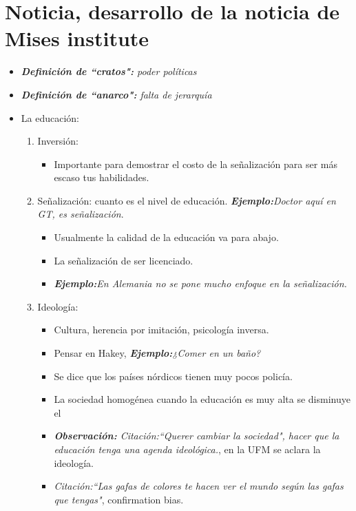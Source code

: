 \section{Noticia, desarrollo de la noticia de Mises institute}
\begin{itemize}
    \item \emph{\textbf{Definición de ``cratos":} poder políticas}
    \item \emph{\textbf{Definición de ``anarco":} falta de jerarquía}
    \item La educación:
        \begin{enumerate}
            \item Inversión:
                \begin{itemize}
                    \item Importante para demostrar el costo de la señalización para ser más escaso tus habilidades.
                \end{itemize}
            \item Señalización: cuanto es el nivel de educación. \emph{\textbf{Ejemplo:}Doctor aquí en GT, es señalización}.
                \begin{itemize}
                    \item Usualmente la calidad de la educación va para abajo.
                    \item La señalización de ser licenciado.
                    \item \emph{\textbf{Ejemplo:}En Alemania no se pone mucho enfoque en la señalización.}
                \end{itemize}
            \item Ideología: 
                \begin{itemize}
                    \item Cultura, herencia por imitación, psicología inversa.
                    \item Pensar en Hakey, \emph{\textbf{Ejemplo:}¿Comer en un baño?}  
                    \item Se dice que los países nórdicos tienen muy pocos policía.
                    \item La sociedad homogénea cuando la educación es muy alta se disminuye el 
                    \item \emph{\textbf{Observación: }\emph{Citación:``Querer cambiar la sociedad"}, hacer que la educación tenga una agenda ideológica.}, en la UFM se aclara la ideología.
                    \item \emph{Citación:``Las gafas de colores te hacen ver el mundo según las gafas que tengas"}, confirmation bias.

\end{itemize}
\end{enumerate}
\end{itemize}
